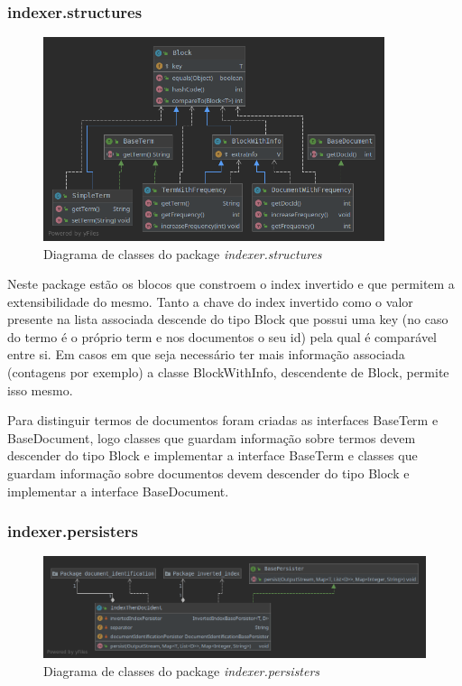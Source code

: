 \documentclass[12pt]{article}
\begin{document}
\subsubsection{indexer.structures}
\begin{figure}[h]
  \center
  \includegraphics[width=10cm]{packages_indexer_structures.png}
  \caption{Diagrama de classes do package \it indexer.structures}
\end{figure}

Neste package estão os blocos que constroem o index invertido e que permitem
a extensibilidade do mesmo. Tanto a chave do index invertido como o valor presente
na lista associada descende do tipo Block que possui uma key (no caso do termo é o
próprio term e nos documentos o seu id) pela qual é comparável entre si. Em casos
em que seja necessário ter mais informação associada (contagens por exemplo)
a classe BlockWithInfo, descendente de Block, permite isso mesmo.

Para distinguir termos de documentos foram criadas as interfaces BaseTerm e BaseDocument,
logo classes que guardam informação sobre termos devem descender do tipo Block e
implementar a interface BaseTerm e classes que guardam informação sobre documentos
devem descender do tipo Block e implementar a interface BaseDocument.

\subsubsection{indexer.persisters}
\begin{figure}[H]
  \center
  \includegraphics[width=16cm]{packages_indexer_persisters.png}
  \caption{Diagrama de classes do package \it indexer.persisters}
\end{figure}
\end{document}
